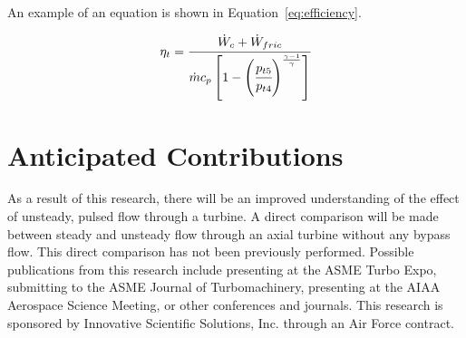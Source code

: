 \documentclass[12pt, letterpaper]{article}
\begin{document}
An example of an equation is shown in Equation~\ref{eq:efficiency}.

\begin{equation}
\eta_t = \cfrac{\dot W_c + \dot W_{fric}}{\dot m c_p \left[ 1 - \left( \cfrac{p_{t5}}{p_{t4}} \right)^\frac{\gamma - 1}{\gamma} \right]}
\label{eq:efficiency}
\end{equation}

%

\section{Anticipated Contributions}

As a result of this research, there will be an improved understanding of the effect of unsteady, pulsed flow through a turbine. A direct comparison will be made between steady and unsteady flow through an axial turbine without any bypass flow. This direct comparison has not been previously performed. Possible publications from this research include presenting at the ASME Turbo Expo, submitting to the ASME Journal of Turbomachinery, presenting at the AIAA Aerospace Science Meeting, or other conferences and journals. This research is sponsored by Innovative Scientific Solutions, Inc. through an Air Force contract.


\pagebreak



\end{document}
